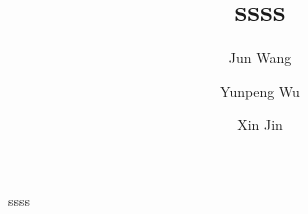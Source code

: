 \documentclass{elsarticle}
\begin{document}
\begin{frontmatter}
\title{ssss}
\author[buaa]{Jun Wang}

\author[buaa]{Yunpeng Wu}

\author[buaa]{Xin Jin}

\address[buaa]{School of Economics and Management, Beihang University, 
Beijing 100083, P.R. China}

\begin{abstract}
  
\end{abstract}

\begin{keyword}
  
\end{keyword}
\end{frontmatter}
ssss


\end{document}
